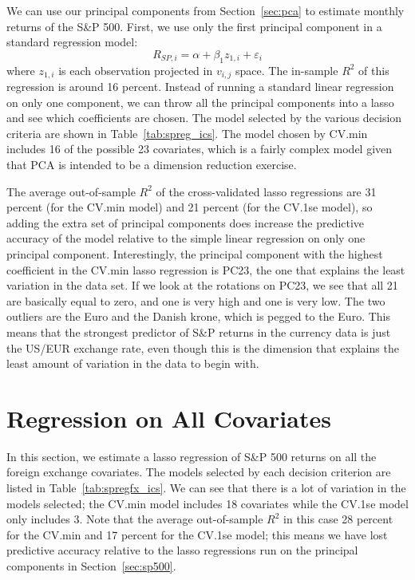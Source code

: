 \documentclass[11pt, fleqn]{article}
\begin{document}
We can use our principal components from Section~\ref{sec:pca} to estimate monthly returns of the S\&P 500. First, we use only the first principal component in a standard regression model:
\begin{equation}
R_{SP,i} = \alpha + \beta_1 z_{1,i} + \varepsilon_{i}
\end{equation}
where $z_{1,i}$ is each observation projected in $v_{i,j}$ space. The in-sample $R^2$ of this regression is around 16 percent. Instead of running a standard linear regression on only one component, we can throw all the principal components into a lasso and see which coefficients are chosen. The model selected by the various decision criteria are shown in Table~\ref{tab:spreg_ics}. The model chosen by CV.min includes 16 of the possible 23 covariates, which is a fairly complex model given that PCA is intended to be a dimension reduction exercise. 



The average out-of-sample $R^2$ of the cross-validated lasso regressions are 31 percent (for the CV.min model) and 21 percent (for the CV.1se model), so adding the extra set of principal components does increase the predictive accuracy of the model relative to the simple linear regression on only one principal component. Interestingly, the principal component with the highest coefficient in the CV.min lasso regression is PC23, the one that explains the least variation in the data set. If we look at the rotations on PC23, we see that all 21 are basically equal to zero, and one is very high and one is very low. The two outliers are the Euro and the Danish krone, which is pegged to the Euro. This means that the strongest predictor of S\&P returns in the currency data is just the US/EUR exchange rate, even though this is the dimension that explains the least amount of variation in the data to begin with.

\section{Regression on All Covariates} \label{sec:regall}

In this section, we estimate a lasso regression of S\&P 500 returns on all the foreign exchange covariates. The models selected by each decision criterion are listed in Table~\ref{tab:spregfx_ics}. We can see that there is a lot of variation in the models selected; the CV.min model includes 18 covariates while the CV.1se model only includes 3. Note that the average out-of-sample $R^2$ in this case 28 percent for the CV.min and 17 percent for the CV.1se model; this means we have lost predictive accuracy relative to the lasso regressions run on the principal components in Section~\ref{sec:sp500}. 
\end{document}
